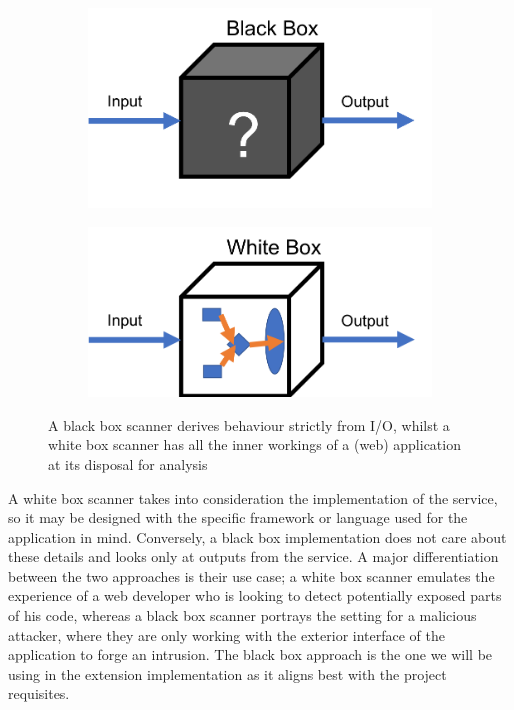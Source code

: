 \begin{figure}[h]
	\centering
	\begin{subfigure}{.5\textwidth}
		\centering
		\includegraphics[width=.8\linewidth]{images/black_box.png}
		\label{fig:blackBox}
	\end{subfigure}%
	\begin{subfigure}{.5\textwidth}
		\centering
		\includegraphics[width=.8\linewidth]{images/white_box.png}
		\label{fig:whiteBox}
	\end{subfigure}
	\caption{A black box scanner derives behaviour strictly from I/O, whilst a white box scanner has all the inner workings of a (web) application at its disposal for analysis}
	\label{fig:test}
\end{figure}


 A white box scanner takes into consideration the implementation of the service, so it may be designed with the specific framework or language used for the application in mind. Conversely, a black box implementation does not care about these details and looks only at outputs from the service. A major differentiation between the two approaches is their use case; a white box scanner emulates the experience of a web developer who is looking to detect potentially exposed parts of his code, whereas a black box scanner portrays the setting for a malicious attacker, where they are only working with the exterior interface of the application to forge an intrusion. The black box approach is the one we will be using in the extension implementation as it aligns best with the project requisites.

